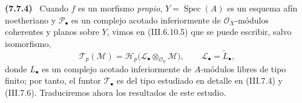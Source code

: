 \documentclass[10pt,oneside]{book}
\newcommand{\sref}[2][]{\textup{(#2)}}
\newenvironment{env}[1][]{\par\medskip\noindent\textbf{(#1)}\ }{\par}
\begin{document}
\begin{env}[7.7.4]
\label{III.7.7.4}
Cuando $f$ es un morfismo \emph{propio}, $Y=\operatorname{Spec}(A)$ es un
esquema afín noetheriano y $\mathscr P_\bullet$ es un complejo acotado
inferiormente de $\mathscr O_X$-módulos coherentes y planos sobre $Y$, vimos en
\sref{III.6.10.5} que se puede escribir, salvo isomorfismo,
\[
  \mathscr T_p(\mathscr M)
  =\mathscr H_p
    \bigl(\mathscr L_\bullet\otimes_{\mathscr O_Y}\mathscr M\bigr),
  \qquad
  \mathscr L_\bullet=\widetilde{L}_\bullet,
\]
donde $L_\bullet$ es un complejo acotado inferiormente de $A$-módulos libres
de tipo finito; por tanto, el funtor $\mathscr T_\bullet$ es del tipo estudiado
en detalle en \sref{III.7.4} y \sref{III.7.6}. Traduciremos ahora los resultados
de este estudio.
\end{env}
\end{document}
